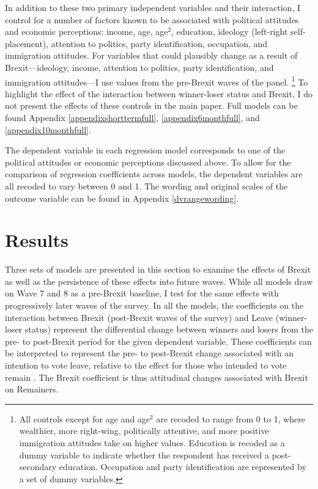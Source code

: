 \documentclass[12pt, letter]{article}
\begin{document}
In addition to these two primary independent variables and their interaction, I control for a number of factors known to be associated with political attitudes and economic perceptions: income, age, age$^2$, education, ideology (left-right self-placement), attention to politics, party identification, occupation, and immigration attitudes. For variables that could plausibly change as a result of Brexit---ideology, income, attention to politics, party identification, and immigration attitudes---I use values from the pre-Brexit waves of the panel. \footnote{All controls except for age and age$^2$ are recoded to range from 0 to 1, where wealthier, more right-wing, politically attentive, and more positive immigration attitudes take on higher values. Education is recoded as a dummy variable to indicate whether the respondent has received a post-secondary education. Occupation and party identification are represented by a set of dummy variables.} To highlight the effect of the interaction between winner-loser status and Brexit, I do not present the effects of these controls in the main paper. Full models can be found Appendix \ref{appendixshorttermfull}, \ref{appendix6monthfull}, and \ref{appendix10monthfull}.

The dependent variable in each regression model corresponds to one of the political attitudes or economic perceptions discussed above. To allow for the comparison of regression coefficients across models, the dependent variables are all recoded to vary between 0 and 1. The wording and original scales of the outcome variable can be found in Appendix \ref{dvrangewording}.


\singlespacing
\section{Results}
\doublespacing


Three sets of models are presented in this section to examine the effects of Brexit as well as the persistence of these effects into future waves. While all models draw on Wave 7 and 8 as a pre-Brexit baseline, I test for the same effects with progressively later waves of the survey. In all the models, the coefficients on the interaction between Brexit (post-Brexit waves of the survey) and Leave (winner-loser status) represent the differential change between winners and losers from the pre- to post-Brexit period for the given dependent variable. These coefficients can be interpreted to represent the pre- to post-Brexit change associated with an intention to vote leave, relative to the effect for those who intended to vote remain \parencite{brambor2005understanding}. The Brexit coefficient is thus attitudinal changes associated with Brexit on Remainers.
\end{document}
